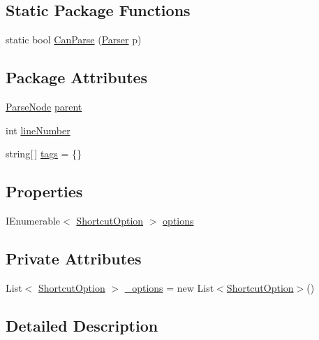 \subsection*{Static Package Functions}
\begin{DoxyCompactItemize}
\item 
static bool \hyperlink{a00136_a906962aae2ecb11535f34249a34703f8}{Can\-Parse} (\hyperlink{a00123}{Parser} p)
\end{DoxyCompactItemize}
\subsection*{Package Attributes}
\begin{DoxyCompactItemize}
\item 
\hyperlink{a00122}{Parse\-Node} \hyperlink{a00122_af313a82103fcc2ff5a177dbb06b92f7b}{parent}
\item 
int \hyperlink{a00122_a18b493382de0fde5b4299c1bd2250075}{line\-Number}
\item 
string\mbox{[}$\,$\mbox{]} \hyperlink{a00122_a58b3a15788fd2d4127d73619dc6d04ae}{tags} = \{\}
\end{DoxyCompactItemize}
\subsection*{Properties}
\begin{DoxyCompactItemize}
\item 
I\-Enumerable$<$ \hyperlink{a00135}{Shortcut\-Option} $>$ \hyperlink{a00136_a91b28e9dce684c476c526c4103b6c488}{options}
\end{DoxyCompactItemize}
\subsection*{Private Attributes}
\begin{DoxyCompactItemize}
\item 
List$<$ \hyperlink{a00135}{Shortcut\-Option} $>$ \hyperlink{a00136_a494c8c422cebbea5c50878db64334873}{\-\_\-options} = new List$<$\hyperlink{a00135}{Shortcut\-Option}$>$()
\end{DoxyCompactItemize}


\subsection{Detailed Description}


